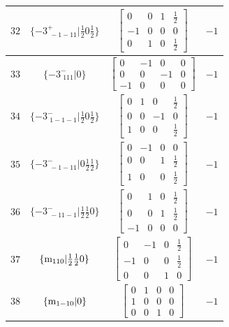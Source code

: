 \documentclass[fleqn,8pt]{jsarticle}
\begin{document}
\begin{longtable}{cccc}
$ 32 $ & $ \{-3^{+}_{\,\,-1-11}|\frac{1}{2} 0 \frac{1}{2}\} $ & $ \begin{bmatrix} 0 & 0 & 1 & \frac{1}{2} \\ -1 & 0 & 0 & 0 \\ 0 & 1 & 0 & \frac{1}{2} \end{bmatrix} $ & $ -1 $ \\ \hline
$ 33 $ & $ \{-3^{-}_{\,\,111}|0\} $ & $ \begin{bmatrix} 0 & -1 & 0 & 0 \\ 0 & 0 & -1 & 0 \\ -1 & 0 & 0 & 0 \end{bmatrix} $ & $ -1 $ \\ \hline
$ 34 $ & $ \{-3^{-}_{\,\,1-1-1}|\frac{1}{2} 0 \frac{1}{2}\} $ & $ \begin{bmatrix} 0 & 1 & 0 & \frac{1}{2} \\ 0 & 0 & -1 & 0 \\ 1 & 0 & 0 & \frac{1}{2} \end{bmatrix} $ & $ -1 $ \\ \hline
$ 35 $ & $ \{-3^{-}_{\,\,-1-11}|0 \frac{1}{2} \frac{1}{2}\} $ & $ \begin{bmatrix} 0 & -1 & 0 & 0 \\ 0 & 0 & 1 & \frac{1}{2} \\ 1 & 0 & 0 & \frac{1}{2} \end{bmatrix} $ & $ -1 $ \\ \hline
$ 36 $ & $ \{-3^{-}_{\,\,-11-1}|\frac{1}{2} \frac{1}{2} 0\} $ & $ \begin{bmatrix} 0 & 1 & 0 & \frac{1}{2} \\ 0 & 0 & 1 & \frac{1}{2} \\ -1 & 0 & 0 & 0 \end{bmatrix} $ & $ -1 $ \\ \hline
$ 37 $ & $ \{{\rm m}_{110}|\frac{1}{2} \frac{1}{2} 0\} $ & $ \begin{bmatrix} 0 & -1 & 0 & \frac{1}{2} \\ -1 & 0 & 0 & \frac{1}{2} \\ 0 & 0 & 1 & 0 \end{bmatrix} $ & $ -1 $ \\ \hline
$ 38 $ & $ \{{\rm m}_{1-10}|0\} $ & $ \begin{bmatrix} 0 & 1 & 0 & 0 \\ 1 & 0 & 0 & 0 \\ 0 & 0 & 1 & 0 \end{bmatrix} $ & $ -1 $ \\ \hline

\end{longtable}
\end{document}
